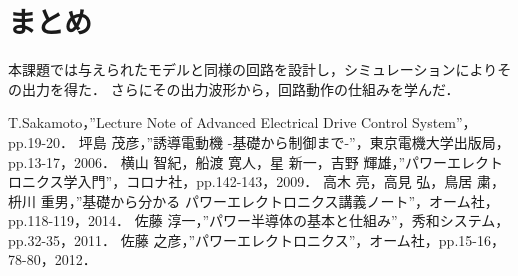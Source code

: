 \documentclass[a4paper,12pt]{jarticle}
\begin{document}
\section{まとめ}
本課題では与えられたモデルと同様の回路を設計し，シミュレーションによりその出力を得た．
さらにその出力波形から，回路動作の仕組みを学んだ．


\begin{thebibliography}{99}
 T.Sakamoto，”Lecture Note of Advanced Electrical Drive Control System”，pp.19-20．
 坪島 茂彦，”誘導電動機 -基礎から制御まで-”，東京電機大学出版局，pp.13-17，2006．
 横山 智紀，船渡 寛人，星 新一，吉野 輝雄，”パワーエレクトロニクス学入門”，コロナ社，pp.142-143，2009．
 高木 亮，高見 弘，鳥居 粛，枡川 重男，”基礎から分かる パワーエレクトロニクス講義ノート”，オーム社，pp.118-119，2014．
 佐藤 淳一，”パワー半導体の基本と仕組み”，秀和システム，pp.32-35，2011．
 佐藤 之彦，”パワーエレクトロニクス”，オーム社，pp.15-16，78-80，2012．
\end{thebibliography}
\end{document}
